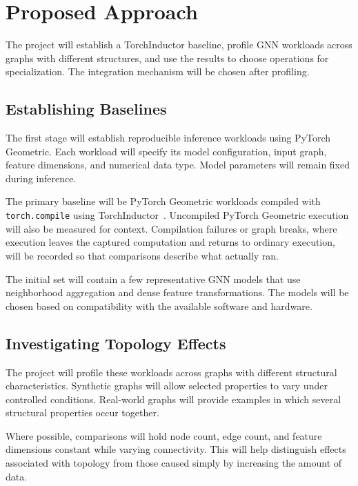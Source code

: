 \section{Proposed Approach}
\label{sec:proposed-approach}

The project will establish a TorchInductor baseline, profile GNN workloads across graphs with different structures, and use the results to choose operations for specialization. The integration mechanism will be chosen after profiling.

\subsection{Establishing Baselines}

The first stage will establish reproducible inference workloads using PyTorch Geometric. Each workload will specify its model configuration, input graph, feature dimensions, and numerical data type. Model parameters will remain fixed during inference.

The primary baseline will be PyTorch Geometric workloads compiled with \texttt{torch.compile} using TorchInductor~\cite{pygCompileDocs}. Uncompiled PyTorch Geometric execution will also be measured for context. Compilation failures or graph breaks, where execution leaves the captured computation and returns to ordinary execution, will be recorded so that comparisons describe what actually ran.

The initial set will contain a few representative GNN models that use neighborhood aggregation and dense feature transformations. The models will be chosen based on compatibility with the available software and hardware.

\subsection{Investigating Topology Effects}

The project will profile these workloads across graphs with different structural characteristics. Synthetic graphs will allow selected properties to vary under controlled conditions. Real-world graphs will provide examples in which several structural properties occur together.

Where possible, comparisons will hold node count, edge count, and feature dimensions constant while varying connectivity. This will help distinguish effects associated with topology from those caused simply by increasing the amount of data.

